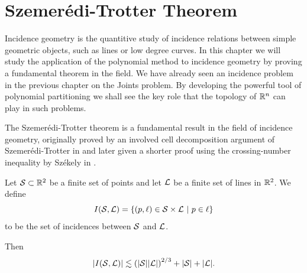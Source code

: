 \chapter{Szemerédi-Trotter Theorem \label{chap:trotter}}


Incidence geometry is the quantitive study of incidence relations between simple geometric objects, such as lines or low degree curves. 
In this chapter we will study the application of the polynomial method to incidence geometry by proving a fundamental theorem in the field.
We have already seen an incidence problem in the previous chapter on the Joints problem. 
By developing the powerful tool of polynomial partitioning we shall see the key role that the topology of $\mathbb R^n$ can play in such problems.


The Szemerédi-Trotter theorem is a fundamental result in the field of incidence geometry, originally proved by an involved cell decomposition argument
of Szemerédi-Trotter in \cite{szemeredi1983extremal} and later given a shorter proof using the crossing-number inequality by Székely in \cite{szekely1997crossing}. 
\begin{theorem}     \label{thm:S-T}
    Let $\mathcal S \subset\mathbb R^2$ be a finite set of points and
    let $\mathcal L$ be a finite set of lines in $\mathbb R^2$. We define 
    \[I(\ES,\LL) = \{(p, \ell) \in \ES \times \LL \ | \ p \in \ell\}\] 
    to be the set of incidences between $\mathcal S$ and $\mathcal L$. 
   
    Then
    \[
        |I(\mathcal S, \mathcal L)| \lesssim \left(|\mathcal S||\mathcal L|\right)^{2/3} + |\mathcal S| + |\mathcal L|.
    \]
\end{theorem}

